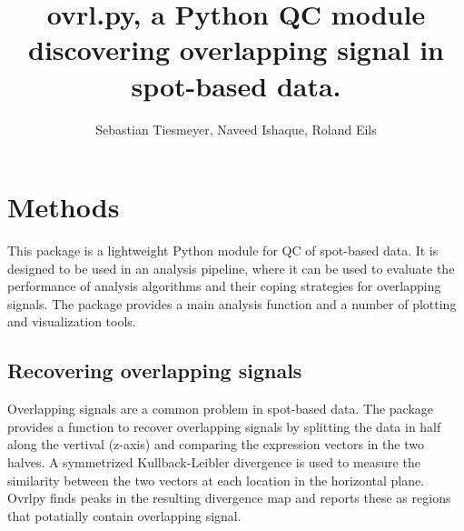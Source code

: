 \documentclass{article}
\title{ovrl.py, a Python QC module discovering overlapping signal in spot-based data.}
\author{Sebastian Tiesmeyer, Naveed Ishaque, Roland Eils}
\begin{document}
\section{Methods}

This package is a lightweight Python module for QC of spot-based data. It is designed to be used in an analysis pipeline, where it can be used to evaluate the performance of analysis algorithms and their coping strategies for overlapping signals. The package provides a main analysis function and a number of plotting and visualization tools. 

\subsection{Recovering overlapping signals}

Overlapping signals are a common problem in spot-based data. The package provides a function to recover overlapping signals by splitting the data in half along the vertival (z-axis) and comparing the expression vectors in the two halves. A symmetrized  Kullback-Leibler divergence is used to measure the similarity between the two vectors at each location in the horizontal plane. Ovrlpy finds peaks in the resulting divergence map and reports these as regions that potatially contain overlapping signal.
\end{document}
